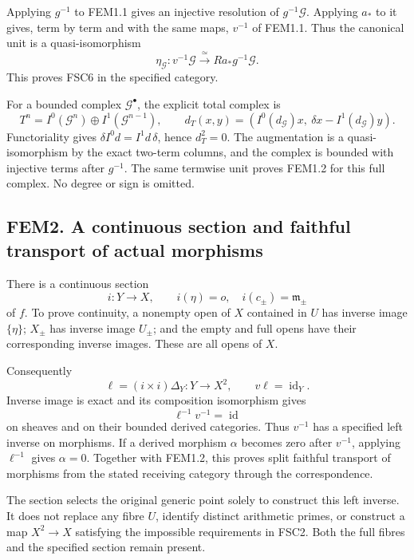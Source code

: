 Applying \(g^{-1}\) to FEM1.1 gives an injective resolution of
\(g^{-1}\mathcal G\). Applying \(a_*\) to it gives, term by term and
with the same maps, \(v^{-1}\) of FEM1.1. Thus the canonical unit is a
quasi-isomorphism \[
\boxed{\eta_{\mathcal G}:v^{-1}\mathcal G
 \xrightarrow{\ \simeq\ }Ra_*g^{-1}\mathcal G.}
\tag{FEM1.2}
\] This proves FSC6 in the specified category.

For a bounded complex \(\mathcal G^\bullet\), the explicit total complex
is \[
T^n=I^0(\mathcal G^n)\oplus I^1(\mathcal G^{n-1}),\qquad
d_T(x,y)=(I^0(d_{\mathcal G})x,\ \delta x-I^1(d_{\mathcal G})y).
\tag{FEM1.3}
\] Functoriality gives \(\delta I^0d=I^1d\,\delta\), hence \(d_T^2=0\).
The augmentation is a quasi-isomorphism by the exact two-term columns,
and the complex is bounded with injective terms after \(g^{-1}\). The
same termwise unit proves FEM1.2 for this full complex. No degree or
sign is omitted.

\subsection{FEM2. A continuous section and faithful transport of actual
morphisms}\label{fem2.-a-continuous-section-and-faithful-transport-of-actual-morphisms}

There is a continuous section \[
i:Y\to X,\qquad i(\eta)=o,\quad i(c_\pm)=\mathfrak m_\pm
\] of \(f\). To prove continuity, a nonempty open of \(X\) contained in
\(U\) has inverse image \(\{\eta\}\); \(X_\pm\) has inverse image
\(U_\pm\); and the empty and full opens have their corresponding inverse
images. These are all opens of \(X\).

Consequently \[
\ell=(i\times i)\Delta_Y:Y\to X^2,\qquad v\ell=\operatorname{id}_Y.
\tag{FEM2.1}
\] Inverse image is exact and its composition isomorphism gives \[
\ell^{-1}v^{-1}=\operatorname{id}
\] on sheaves and on their bounded derived categories. Thus \(v^{-1}\)
has a specified left inverse on morphisms. If a derived morphism
\(\alpha\) becomes zero after \(v^{-1}\), applying \(\ell^{-1}\) gives
\(\alpha=0\). Together with FEM1.2, this proves split faithful transport
of morphisms from the stated receiving category through the
correspondence.

The section selects the original generic point solely to construct this
left inverse. It does not replace any fibre \(U\), identify distinct
arithmetic primes, or construct a map \(X^2\to X\) satisfying the
impossible requirements in FSC2. Both the full fibres and the specified
section remain present.

